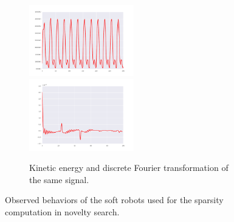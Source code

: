 \documentclass{sig-alternate}
\begin{document}
\begin{figure}[t!]
\begin{subfigure}[t]{0.23\textwidth}
\end{subfigure}~
\begin{subfigure}[t]{0.23\textwidth}
\centering
\includegraphics[width=0.5\textwidth]{../Figures/Behaviors/ke.pdf}~
\includegraphics[width=0.5\textwidth]{../Figures/Behaviors/kedft.pdf}
\caption{Kinetic energy and discrete Fourier transformation of the same signal.}
\end{subfigure}
\caption{Observed behaviors of the soft robots used for the sparsity computation in novelty search.}
\label{fig:Behaviors}
\end{figure}
\end{document}
